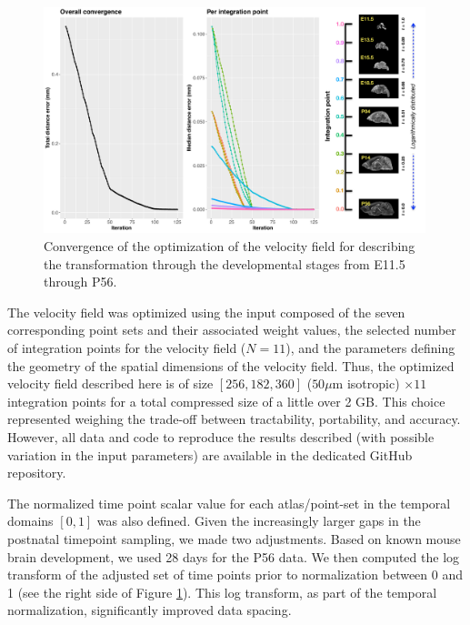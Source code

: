 \documentclass[
  12pt,
]{article}
\begin{document}
\begin{figure}[!htb]
\centering
\includegraphics[width=0.99\textwidth]{Figures/convergence.pdf}
\caption{Convergence of the optimization of the velocity field for describing the 
transformation through the developmental stages from E11.5 through P56.}
\label{fig:convergence}
\end{figure}

The velocity field was optimized using the input composed of the seven
corresponding point sets and their associated weight values, the
selected number of integration points for the velocity field (\(N=11\)),
and the parameters defining the geometry of the spatial dimensions of
the velocity field. Thus, the optimized velocity field described here is
of size \([256, 182, 360]\) (\(50 \mu\)m isotropic) \(\times 11\)
integration points for a total compressed size of a little over 2 GB.
This choice represented weighing the trade-off between tractability,
portability, and accuracy. However, all data and code to reproduce the
results described (with possible variation in the input parameters) are
available in the dedicated GitHub repository.

The normalized time point scalar value for each atlas/point-set in the
temporal domains \([0, 1]\) was also defined. Given the increasingly
larger gaps in the postnatal timepoint sampling, we made two
adjustments. Based on known mouse brain development, we used 28 days for
the P56 data. We then computed the log transform of the adjusted set of
time points prior to normalization between 0 and 1 (see the right side
of Figure \ref{fig:convergence}). This log transform, as part of the
temporal normalization, significantly improved data spacing.
\end{document}
